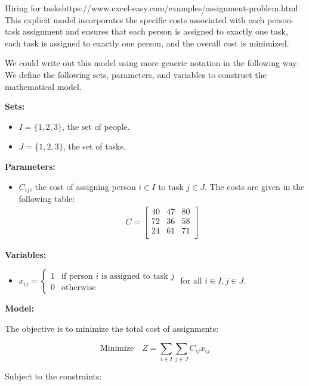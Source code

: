 \begin{examplewithallcode}{Hiring for tasks}{https://www.excel-easy.com/examples/assignment-problem.html}{}{}
This explicit model incorporates the specific costs associated with each person-task assignment and ensures that each person is assigned to exactly one task, each task is assigned to exactly one person, and the overall cost is minimized.




We could write out this model using more generic notation in the following way: We define the following sets, parameters, and variables to construct the mathematical model.

\textbf{Sets:}
\begin{itemize}
    \item $I = \{1, 2, 3\}$, the set of people.
    \item $J = \{1, 2, 3\}$, the set of tasks.
\end{itemize}

\textbf{Parameters:}
\begin{itemize}
    \item $C_{ij}$, the cost of assigning person $i \in I$ to task $j \in J$. The costs are given in the following table:
    \begin{align*}
        C = \begin{bmatrix}
            40 & 47 & 80 \\
            72 & 36 & 58 \\
            24 & 61 & 71 \\
        \end{bmatrix}
    \end{align*}
\end{itemize}

\textbf{Variables:}
\begin{itemize}
    \item $x_{ij} = 
    \begin{cases} 
    1 & \text{if person } i \text{ is assigned to task } j \\
    0 & \text{otherwise}
    \end{cases}$ for all $i \in I, j \in J$.
\end{itemize}

\textbf{Model:}

The objective is to minimize the total cost of assignments:

\begin{equation}
    \text{Minimize} \quad Z = \sum_{i \in I} \sum_{j \in J} C_{ij} x_{ij}
\end{equation}

Subject to the constraints:


\end{examplewithallcode}
